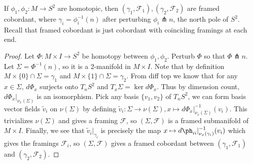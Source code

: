\documentclass[12pt]{article}
\begin{document}
\begin{problem}[3]
If $ \phi_1, \phi_2: M \to S^2$ are homotopic, then $ ( \gamma_1, \mathcal{ F}_1), ( \gamma_2, \mathcal{ F}_2)$ are framed cobordant, where $ \gamma_i = \phi_i ^{-1}(n)$ after perturbing $ \phi_i \pitchfork n$, the north pole of $ S^2$. Recall that framed cobordant is just cobordant with coinciding framings at each end.

\begin{proof}
Let $ \Phi: M \times I \to S^2$ be homotopy between $ \phi_1, \phi_2$. Perturb $ \Phi$ so that $ \Phi \pitchfork n$. Let $ \Sigma = \Phi ^{-1}(n)$, so it is a 2-manifold in $ M \times I$. Note that by definition $ M \times \{0\} \cap \Sigma = \gamma_1 $ and $ M \times \{1\} \cap \Sigma = \gamma_2$. From diff top we know that for any $ x \in \Sigma $, $ d\Phi_x$ surjects onto $ T_nS^2$ and $ T_x \Sigma  = \ker d\Phi_x$. Thus by dimension count, $ d\Phi_x|_{\nu_x( \Sigma )}$ is an isomorphism. Pick any basis $ \{v_1,v_2\} $ of $ T_nS^2$, we can form basis vector fields $ \widetilde{ v}_i$ on $ \nu( \Sigma )$ by defining $ \widetilde{ v}_i: \Sigma \to \nu( \Sigma ), x \mapsto d\Phi_x|_{\nu_x( \Sigma )}^{-1}(v_i)$. This trivializes $ \nu( \Sigma )$ and gives a framing $ \mathcal{F}$, so $ (\Sigma, \mathcal{F}) $ is a framed submanifold of $ M \times I$. Finally, we see that $ \widetilde{ v}_i|_{ \gamma_i}$ is precisely the map $ x\mapsto d\ph_{ii} |_{\nu_x( \gamma_i)}^{-1}(v_i)$ which gives the framings $ \mathcal{F}_i$, so $ (\Sigma, \mathcal{F}) $ gives a framed cobordant between $ ( \gamma_1, \mathcal{F}_1)$ and $ ( \gamma_2, \mathcal{F}_2)$.
\end{proof}
\end{problem}
\end{document}
